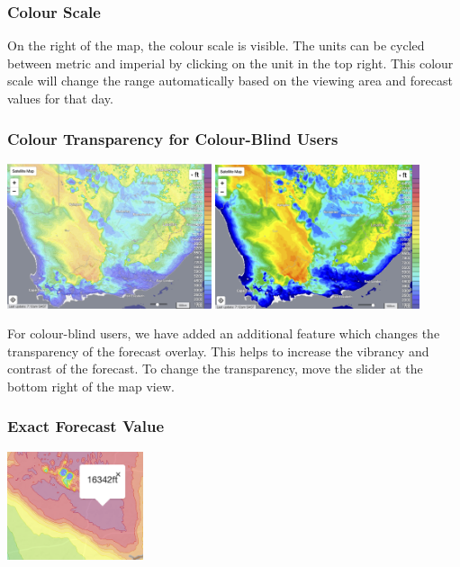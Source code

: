 \documentclass[11pt,a4paper]{article}
\begin{document}
\subsubsection{Colour Scale}
On the right of the map, the colour scale is visible. The units can be cycled between metric and imperial by clicking on the unit in the top right. This colour scale will change the range automatically based on the viewing area and forecast values for that day.

\subsubsection{Colour Transparency for Colour-Blind Users}\label{subsec:colorblind}
\begin{center}
\includegraphics[width=6cm]{images/map_color1.png}
\includegraphics[width=6cm]{images/map_color2.png}
\end{center}


For colour-blind users, we have added an additional feature which changes the transparency of the forecast overlay. This helps to increase the vibrancy and contrast of the forecast. To change the transparency, move the slider at the bottom right of the map view.

\subsubsection{Exact Forecast Value}
\begin{center}
\includegraphics[width=4cm]{images/exact_value.png}
\end{center}
\end{document}
